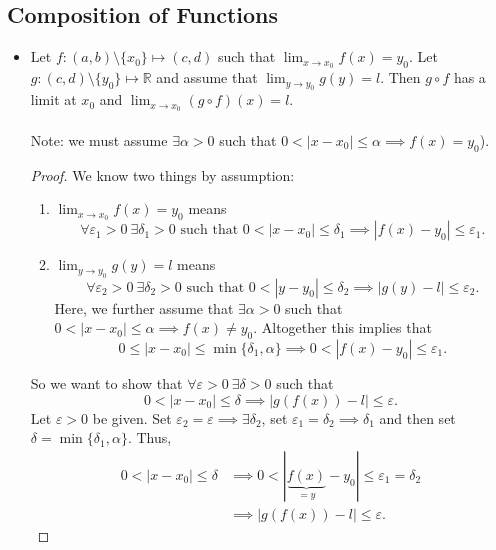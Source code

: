 \documentclass{article}
\newcommand{\R}{\mathbb{R}}
\newcommand{\?}{\stackrel{?}{=}}
\theoremstyle{definition} %
\begin{document}
\subsection{Composition of Functions}

\begin{itemize}
    \item[]
          \begin{lemma}
              Let $f: (a, b) \setminus \{x_0\} \mapsto (c, d)$ such that $\lim_{x \to x_0} f(x) = y_0$. Let $g: (c, d) \setminus \{y_0\} \mapsto \R$ and assume that $\lim_{y \to y_0} g(y) = l$. Then $g \circ f$ has a limit at $x_0$ and $\lim_{x \to x_0} (g \circ f)(x) = l$. \\\\
              Note: we must assume $\exists \alpha > 0$ such that $0 < |x - x_0| \leq \alpha \implies f(x) = y_0$).
          \end{lemma}
          \begin{proof}
              We know two things by assumption:
              \begin{enumerate}[label=(\arabic*)]
                  \item $\lim_{x \to x_0} f(x) = y_0$ means
                        $$\forall \varepsilon_1 > 0 \ \exists \delta_1 > 0 \text{ such that } 0 < |x - x_0| \leq \delta_1 \implies |f(x) - y_0| \leq \varepsilon_1.$$
                  \item $\lim_{y \to y_0} g(y) = l$ means
                        $$\forall \varepsilon_2 > 0 \ \exists \delta_2 > 0 \text{ such that } 0 < |y - y_0| \leq \delta_2 \implies |g(y) - l| \leq \varepsilon_2.$$
                        Here, we further assume that $\exists \alpha > 0$ such that $0 < |x - x_0| \leq \alpha \implies f(x) \neq y_0$. Altogether this implies that
                        $$0 \leq |x - x_0| \leq \min\{\delta_1, \alpha\} \implies 0 < |f(x) - y_0| \leq \varepsilon_1.$$
              \end{enumerate}
              So we want to show that $\forall \varepsilon > 0 \ \exists \delta > 0$ such that
              $$0 < |x - x_0| \leq \delta \implies |g(f(x)) - l| \leq \varepsilon.$$
              Let $\varepsilon > 0$ be given. Set $\varepsilon_2 = \varepsilon \implies \exists \delta_2$, set $\varepsilon_1 = \delta_2 \implies \delta_1$ and then set $\delta = \min\{\delta_1, \alpha\}$. Thus,
              \begin{align*}
                  0 < |x - x_0| \leq \delta & \implies 0 < |\underbrace{f(x)}_{= y} - y_0| \leq \varepsilon_1 = \delta_2 \\
                                            & \implies |g(f(x)) - l| \leq \varepsilon.
              \end{align*}
          \end{proof}
\end{itemize}
\end{document}
